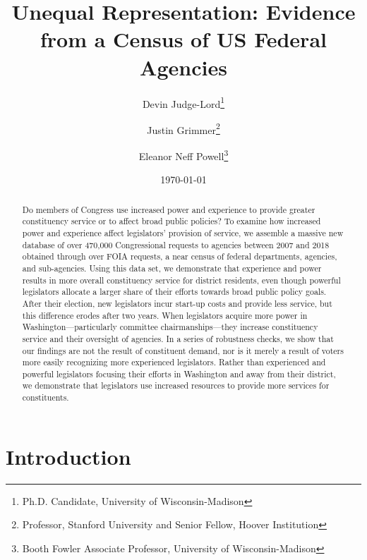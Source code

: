 \documentclass[12pt]{article}
\title{Unequal Representation: Evidence from a Census of US Federal Agencies}
\author{Devin Judge-Lord\thanks{Ph.D. Candidate, University of Wisconsin-Madison}\and Justin Grimmer\thanks{Professor, Stanford University and Senior Fellow, Hoover Institution} \and Eleanor Neff Powell\thanks{Booth Fowler Associate Professor, University of Wisconsin-Madison}}
\date{\today}
\begin{document}
\maketitle




\begin{abstract}
\noindent 
Do members of Congress use increased power and experience to provide greater constituency service or to affect broad public policies? To examine how increased power and experience affect legislators' provision of service, we assemble a massive new database of over 470,000 Congressional requests to agencies between 2007 and 2018 obtained through over  FOIA requests, a near census of federal departments, agencies, and sub-agencies. Using this data set, we demonstrate that experience and power results in more overall constituency service for district residents, even though powerful legislators allocate a larger share of their efforts towards broad public policy goals. After their election, new legislators incur start-up costs and provide less service, but this difference erodes after two years. When legislators acquire more power in Washington---particularly committee chairmanships---they increase constituency service and their oversight of agencies. In a series of robustness checks, we show that our findings are not the result of constituent demand, nor is it merely a result of voters more easily recognizing more experienced legislators. Rather than experienced and powerful legislators focusing their efforts in Washington and away from their district, we demonstrate that legislators use increased resources to provide more services for constituents. 
\end{abstract}



%

%

\newpage
\doublespacing
\section{Introduction}
\end{document}
